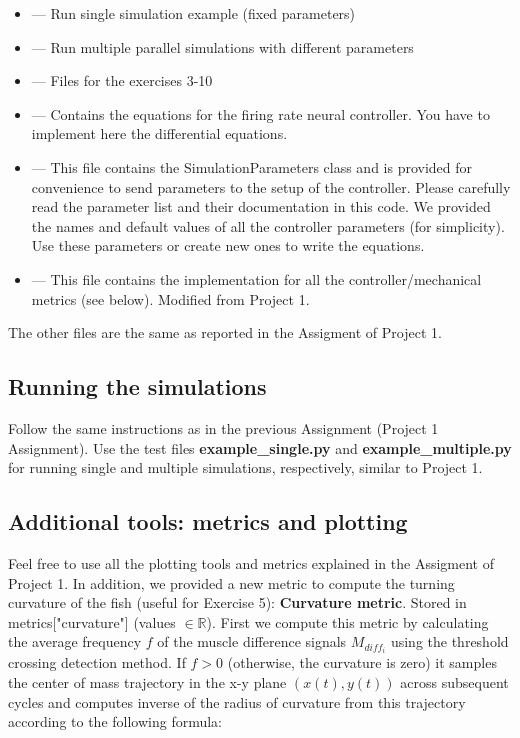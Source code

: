 \documentclass{cmc}
\begin{document}
\begin{itemize}
\item {} --- Run single simulation example (fixed parameters)
\item {} --- Run multiple parallel simulations with different parameters
\item {} --- Files for the exercises 3-10
\item {} --- Contains the equations for the firing rate neural controller. You have to implement here the differential equations.
\item {} --- This file contains the
  SimulationParameters class and is provided for convenience to send parameters
  to the setup of the controller. Please carefully read the parameter list
  and their documentation in this code. We provided the names and default values of
  all the controller parameters (for simplicity). Use these parameters or create
  new ones to write the equations.
\item {} --- This file contains the implementation
  for all the controller/mechanical metrics (see below). Modified from Project 1.
\end{itemize}

The other files are the same as reported in the Assigment of Project 1.

\subsection*{Running the simulations}\label{subsec:simulating}
Follow the same instructions as in the previous Assignment (Project 1 Assignment). Use the test files \textbf{example\_single.py} and \textbf{example\_multiple.py} for running single and multiple simulations, respectively, similar to Project 1.


\subsection*{Additional tools: metrics and plotting}\label{subsec:plotting}
Feel free to use all the plotting tools and metrics explained in the Assigment of Project 1. In addition, we provided a new metric to compute the turning curvature of the fish (useful for Exercise 5):  \newline
\textbf{Curvature metric}. Stored in metrics["curvature"] (values $\in \mathbb{R}$). First we compute this metric by calculating the average frequency $f$ of the muscle difference signals $M_{diff_i}$ using the threshold crossing detection method. If $f>0$ (otherwise, the curvature is zero) it samples the center of mass trajectory in the x-y plane $(x(t),y(t))$ across subsequent cycles and computes inverse of the radius of curvature from this trajectory according to the following formula:
\end{document}
